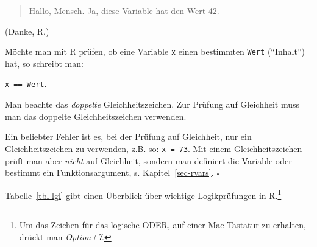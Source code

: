 \documentclass[
  a4paper,
  DIV=11]{scrreprt}
\theoremstyle{definition}
\theoremstyle{definition}
\theoremstyle{definition}
\theoremstyle{remark}
\begin{document}
\begin{quote}
{} Hallo, Mensch. Ja, diese Variable hat den Wert 42.
\end{quote}

(Danke, R.)

Möchte man mit R prüfen, ob eine Variable \texttt{x} einen bestimmten
\texttt{Wert} (``Inhalt'') hat, so schreibt man:

\texttt{x\ ==\ Wert}.

\begin{tcolorbox}[enhanced jigsaw, leftrule=.75mm, opacitybacktitle=0.6, colback=white, colframe=quarto-callout-important-color-frame, coltitle=black, colbacktitle=quarto-callout-important-color!10!white, opacityback=0, left=2mm, breakable, titlerule=0mm, toptitle=1mm, bottomtitle=1mm, rightrule=.15mm, title=\textcolor{quarto-callout-important-color}{\faExclamation}\hspace{0.5em}{Wichtig}, arc=.35mm, bottomrule=.15mm, toprule=.15mm]

Man beachte das \emph{doppelte} Gleichheitszeichen. Zur Prüfung auf
Gleichheit muss man das doppelte Gleichheitszeichen verwenden.

\end{tcolorbox}

\begin{tcolorbox}[enhanced jigsaw, leftrule=.75mm, opacitybacktitle=0.6, colback=white, colframe=quarto-callout-caution-color-frame, coltitle=black, colbacktitle=quarto-callout-caution-color!10!white, opacityback=0, left=2mm, breakable, titlerule=0mm, toptitle=1mm, bottomtitle=1mm, rightrule=.15mm, title=\textcolor{quarto-callout-caution-color}{\faFire}\hspace{0.5em}{Vorsicht}, arc=.35mm, bottomrule=.15mm, toprule=.15mm]

Ein beliebter Fehler ist es, bei der Prüfung auf Gleichheit, nur ein
Gleichheitszeichen zu verwenden, z.B. so: \texttt{x\ =\ 73}. Mit einem
Gleichheitszeichen prüft man aber \emph{nicht} auf Gleichheit, sondern
man definiert die Variable oder bestimmt ein Funktionsargument, s.
Kapitel~\ref{sec-rvars}. \(\square\)

\end{tcolorbox}

Tabelle~\ref{tbl-lgl} gibt einen Überblick über wichtige Logikprüfungen
in R.\footnote{Um das Zeichen für das logische ODER, \texttt{\textbar{}}
  auf einer Mac-Tastatur zu erhalten, drückt man \emph{Option+7}.}
\end{document}
